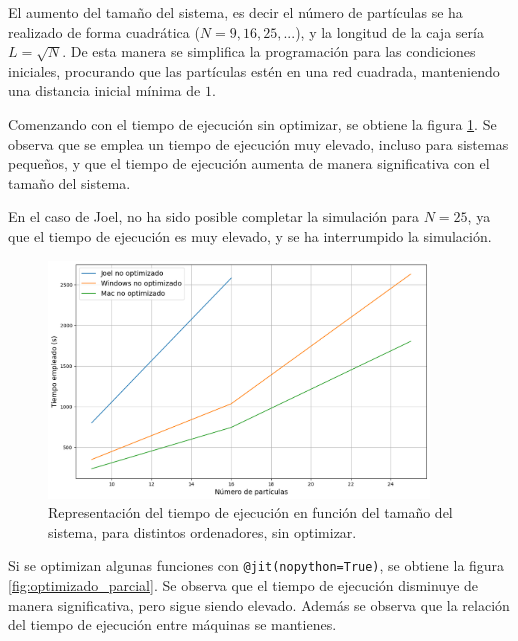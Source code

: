 \documentclass[11pt, twoside]{article} %
\begin{document}
El aumento del tamaño del sistema, es decir el número de partículas se ha realizado
de forma cuadrática ($N = 9, 16, 25, ...$), y la longitud de la caja sería $L = \sqrt{N}$.
De esta manera se simplifica la programación para las condiciones iniciales, procurando
que las partículas estén en una red cuadrada, manteniendo una distancia inicial mínima 
de $1$.

Comenzando con el tiempo de ejecución sin optimizar, se obtiene la figura 
\ref{fig:sin_optimizar}. Se observa que se emplea un tiempo de ejecución muy elevado,
incluso para sistemas pequeños, y que el tiempo de ejecución aumenta de manera 
significativa con el tamaño del sistema.

En el caso de Joel, no ha sido posible completar la simulación para $N=25$, ya que
el tiempo de ejecución es muy elevado, y se ha interrumpido la simulación.

\begin{figure}[h!]
    \centering
    \includegraphics[width=0.9\textwidth]{plots/no_optimizado.png}
    \caption{Representación del tiempo de ejecución en función del tamaño del sistema, 
    para distintos ordenadores, sin optimizar.}
    \label{fig:sin_optimizar}
\end{figure}

Si se optimizan algunas funciones con \texttt{@jit(nopython=True)}, se obtiene la 
figura \ref{fig:optimizado_parcial}. Se observa que el tiempo de ejecución disminuye
de manera significativa, pero sigue siendo elevado. Además se observa que la relación 
del tiempo de ejecución entre máquinas se mantienes.
\end{document}
